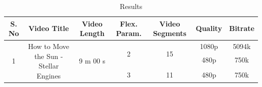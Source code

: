 \documentclass{article}
\begin{document}
		\begin{table}[ht]
		\caption{Results}\label{results}
		\vspace{3mm}
\begin{tabular}{|c|c|c|c|c|c|c|}
\hline
S. No              & Video Title                                            & Video Length              & Flex. Param.       & Video Segments      & Quality                & Bitrate                \\ \hline \hline
\multirow{7}{*}{1} & \multirow{7}{3cm}{How to Move the Sun - Stellar Engines} & \multirow{7}{*}{9 m 00 s} & \multirow{5}{*}{2} & \multirow{5}{*}{15} & \multirow{2}{*}{1080p} & \multirow{2}{*}{5094k} \\
                   &                                                        &                           &                    &                     &                        &                        \\ \cline{6-7} 
                   &                                                        &                           &                    &                     & \multirow{3}{*}{480p}  & \multirow{3}{*}{750k}  \\
                   &                                                        &                           &                    &                     &                        &                        \\
                   &                                                        &                           &                    &                     &                        &                        \\ \cline{4-7} 
                   &                                                        &                           & \multirow{2}{*}{3} & \multirow{2}{*}{11} & \multirow{2}{*}{480p}  & \multirow{2}{*}{750k}  \\
                   &                                                        &                           &                    &                     &                        &                        \\ \hline
\end{tabular}\vspace{2mm}


\end{table}
\end{document}
